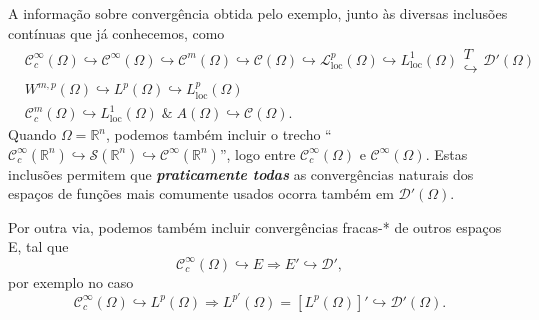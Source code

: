 \documentclass[../distribution_theory_notes.tex]{subfiles}
\begin{document}
\begin{tcolorbox}[
		skin=enhanced,
		title=Observação,
		fonttitle=\bfseries,
		colframe=black,
		colbacktitle=cyan!75!white,
		colback=cyan!15,
		colbacklower=black,
		coltitle=black,
		drop fuzzy shadow,
	]
	A informação sobre convergência obtida pelo exemplo, junto às diversas inclusões contínuas que já conhecemos, como
	\begin{align*}
		 & \mathcal{C}_{c}^{\infty}(\Omega )\hookrightarrow \mathcal{C}^{\infty}(\Omega )\hookrightarrow \mathcal{C}^{m}(\Omega )\hookrightarrow \mathcal{C}(\Omega ) \hookrightarrow \mathcal{L}_{\mathrm{loc}}^{p}(\Omega ) \hookrightarrow L_{\mathrm{loc}}^{1}(\Omega )\substack{ T \\\hookrightarrow }\mathcal{D}'(\Omega )\\
		 & W^{m, p}(\Omega )\hookrightarrow L^{p}(\Omega )\hookrightarrow L_{\mathrm{loc}}^{p}(\Omega )                                                                                                                                                                                 \\
		 & \mathcal{C}_{c}^{m}(\Omega )\hookrightarrow L_{\mathrm{loc}}^{1}(\Omega )\;\&\; A(\Omega )\hookrightarrow \mathcal{C}(\Omega ).
	\end{align*}
	Quando \(\Omega  = \mathbb{R}^{n}\), podemos também incluir o trecho ``\(\mathcal{C}_{c}^{\infty}(\mathbb{R}^{n})\hookrightarrow \mathcal{S}(\mathbb{R}^{n})\hookrightarrow \mathcal{C}^{\infty}(\mathbb{R}^{n})\)'', logo entre \(\mathcal{C}_{c}^{\infty}(\Omega )\) e \(\mathcal{C}^{\infty}(\Omega )\). Estas inclusões permitem que \textit{\textbf{praticamente todas}} as convergências naturais dos espaços de funções mais comumente usados ocorra também em \(\mathcal{D}'(\Omega )\).

	Por outra via, podemos também incluir convergências fracas-* de outros espaços E, tal que
	\[
		\mathcal{C}_{c}^{\infty}(\Omega )\hookrightarrow E \Rightarrow E'\hookrightarrow \mathcal{D}',
	\]
	por exemplo no caso
	\[
		\mathcal{C}_{c}^{\infty}(\Omega )\hookrightarrow L^{p}(\Omega ) \Rightarrow L^{p'}(\Omega ) = [L^{p}(\Omega )]'\hookrightarrow \mathcal{D}'(\Omega ).
	\]
\end{tcolorbox}
\end{document}
